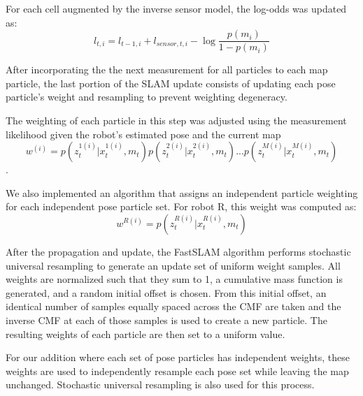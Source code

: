 For each cell augmented by the inverse sensor model, the log-odds was updated as:
$$l_{t,i}=l_{t-1,i}+l_{sensor,t,i}-\log\frac{p(m_i)}{1-p(m_i)}$$

After incorporating the the next measurement for all particles to each map particle, the last portion of the SLAM update consists of updating each pose particle’s weight and resampling to prevent weighting degeneracy.

The weighting of each particle in this step was adjusted using the measurement likelihood given the robot's estimated pose and the current map 
$$w^{(i)}=p(z_t^{1(i)}|x_t^{1(i)},m_t)p(z_t^{2(i)}|x_t^{2(i)},m_t)...p(z_t^{M(i)}|x_t^{M(i)},m_t)$$. 

We also implemented an algorithm that assigns an independent particle weighting for each independent pose particle set. For robot R, this weight was computed as:
$$w^{R(i)}=p(z_t^{R(i)}|x_t^{R(i)},m_t)$$

After the propagation and update, the FastSLAM algorithm performs stochastic universal resampling to generate an update set of uniform weight samples. All weights are normalized such that they sum to 1, a cumulative mass function is generated, and a random initial offset is chosen. From this initial offset, an identical number of samples equally spaced across the CMF are taken and the inverse CMF at each of those samples is used to create a new particle. The resulting weights of each particle are then set to a uniform value. 

For our addition where each set of pose particles has independent weights, these weights are used to independently resample each pose set while leaving the map unchanged. Stochastic universal resampling is also used for this process.

